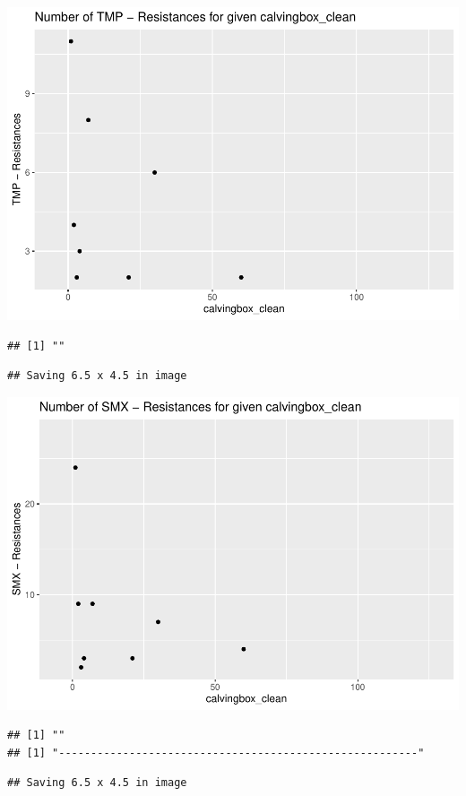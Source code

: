 \documentclass[
]{article}
\begin{document}
\includegraphics{NResistenzen_files/figure-latex/numerical_variables-29.pdf}

\begin{verbatim}
## [1] ""
\end{verbatim}

\begin{verbatim}
## Saving 6.5 x 4.5 in image
\end{verbatim}

\includegraphics{NResistenzen_files/figure-latex/numerical_variables-30.pdf}

\begin{verbatim}
## [1] ""
## [1] "--------------------------------------------------------"
\end{verbatim}

\begin{verbatim}
## Saving 6.5 x 4.5 in image
\end{verbatim}
\end{document}
